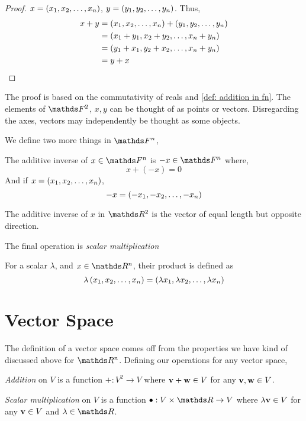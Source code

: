 \begin{proof}
    \(x = \left(x_{1}, x_{2}, \dots, x_{n}\right)\), \(y = \left(y_{1}, y_{2}, \dots, y_{n}\right)\). Thus,
    \begin{align*}
        x + y &= \left(x_{1}, x_{2}, \dots, x_{n}\right) + \left(y_{1}, y_{2}, \dots, y_{n}\right)\\
        &= (x_1 + y_1, x_2 + y_2, \dots, x_n + y_n)\\
        &= (y_1 + x_1, y_2 + x_2, \dots, x_n + y_n)\\
        &= y + x
    \end{align*}
\end{proof}

The proof is based on the commutativity of reals and \cref{def: addition in fn}. 
The elements of \(\FF^2\), \(x, y\) can be thought of as points or vectors. Disregarding
the axes, vectors may independently be thought as some objects.

We define two more things in \(\FF^n\),

\begin{definition}
    The additive inverse of \(x \in \FF^n\) is \(-x \in \FF^n\) where, 
    \[
        x + (-x) = 0
    \]
    And if \(x = \left(x_{1}, x_{2}, \dots, x_{n}\right)\), 
    \[
        -x = \left(-x_{1}, -x_{2}, \dots, -x_{n}\right)
    \]
\end{definition}

The additive inverse of \(x\) in \(\RR^2\) is the vector of equal length but opposite direction.

The final operation is \emph{scalar multiplication}


\begin{definition}
    For a scalar \(\lambda\), and \(x \in \RR^n\), their product is defined as
    \[
        \lambda \left(x_{1}, x_{2}, \dots, x_{n}\right) = \left(\lambda x_{1}, \lambda x_{2}, \dots, \lambda x_{n}\right)
    \]
\end{definition}

\section{Vector Space}

The definition of a vector space comes off from the properties we have kind of discussed
above for \(\RR^n\). Defining our operations for any vector space,

\begin{definition}
    \emph{Addition} on \(V\) is a function \(+ : V^2 \to V\) where \(\boldsymbol{\mathbf{v}} + \boldsymbol{\mathbf{w}} \in V\) for 
    any \(\boldsymbol{\mathbf{\boldsymbol{\mathbf{v}}}}, \boldsymbol{\mathbf{\boldsymbol{\mathbf{w}}}} \in V\).

    \noindent\emph{Scalar multiplication} on \(V\) is a function \(\bullet : V \times \RR \to V\) where 
    \(\lambda \boldsymbol{\mathbf{v}} \in V\) for any \(\boldsymbol{\mathbf{v}} \in V\) and \(\lambda \in \RR\). 
\end{definition}

